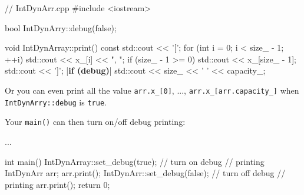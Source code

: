 \begin{consolethree}[escapeinside=||]
// IntDynArr.cpp
#include <iostream>

bool IntDynArry::debug(false);

void IntDynArray::print() const
{
    std::cout << '[';
    for (int i = 0; i < size_ - 1; ++i)
    {
        std::cout << x_[i] << ", ";
    }
    if (size_ - 1 >= 0)
    {
        std::cout << x_[size_ - 1];
    }
    std::cout << ']';
    |{\bf if (debug)}|
    {
        std::cout << size_ << ' '
                  << capacity_;
    }
}
\end{consolethree}

Or you can even print all the value \texttt{arr.x\_[0]}, ...,
\texttt{arr.x\_[arr.capacity\_]} when \texttt{IntDynArry::debug} is
\texttt{true}.

Your \texttt{main()} can then turn on/off debug printing:

\begin{consolethree}[escapeinside=||]
...

int main()
{
    IntDynArray::set_debug(true); // turn on debug
                                  // printing
    IntDynArr arr;
    arr.print();
    IntDynArr::set_debug(false); // turn off debug
                                 // printing
    arr.print();
    return 0;
}
\end{consolethree}


